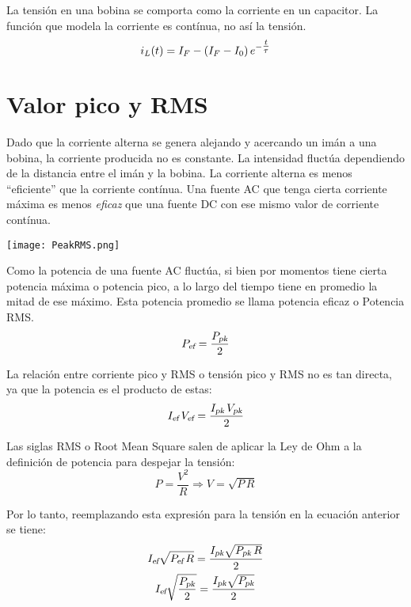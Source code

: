 \documentclass[a5paper,12pt,twoside]{book}
\begin{document}
La tensión en una bobina se comporta como la corriente en un capacitor. La función que modela la corriente es contínua, no así la tensión.
\begin{equation*}
    i_L(t) = I_F - \left(I_F - I_0\right) e^{-\tfrac{t}{\tau}}
\end{equation*}


\section{Valor pico y RMS}

Dado que la corriente alterna se genera alejando y acercando un imán a una bobina, la corriente producida no es constante.
La intensidad fluctúa dependiendo de la distancia entre el imán y la bobina.
La corriente alterna es menos ``eficiente'' que la corriente contínua.
Una fuente AC que tenga cierta corriente máxima es menos \emph{eficaz} que una fuente DC con ese mismo valor de corriente contínua.

\begin{center}
    \texttt{[image: PeakRMS.png]}
\end{center}

Como la potencia de una fuente AC fluctúa, si bien por momentos tiene cierta potencia máxima o potencia pico, a lo largo del tiempo tiene en promedio la mitad de ese máximo. Esta potencia promedio se llama potencia eficaz o Potencia RMS.
\begin{equation*}
    {{{P}_\textsl{{ef}}}} = \frac{{{{P}_\textsl{{pk}}}}}{2}
\end{equation*}

La relación entre corriente pico y RMS o tensión pico y RMS no es tan directa, ya que la potencia es el producto de estas:
\begin{equation*}
    {{{I}_\textsl{{ef}}}} \, {{{V}_\textsl{{ef}}}} = \frac{{{{I}_\textsl{{pk}}}} \, {{{V}_\textsl{{pk}}}}}{2}
\end{equation*}

Las siglas RMS o Root Mean Square salen de aplicar la Ley de Ohm a la definición de potencia para despejar la tensión:
\begin{equation*}
    P = \frac{V^2}{R} \Rightarrow V = \sqrt{P \, R}
\end{equation*}

Por lo tanto, reemplazando esta expresión para la tensión en la ecuación anterior se tiene:
\begin{gather*}
    {{{I}_\textsl{{ef}}}} \sqrt{{{{P}_\textsl{{ef}}}} \, R} = \frac{{{{I}_\textsl{{pk}}}} \sqrt{{{{P}_\textsl{{pk}}}} \, R}}{2}
    \\
    {{{I}_\textsl{{ef}}}} \sqrt{\frac{{{{P}_\textsl{{pk}}}}}{2}} = \frac{{{{I}_\textsl{{pk}}}} \sqrt{{{{P}_\textsl{{pk}}}}}}{2}
\end{gather*}
\end{document}
